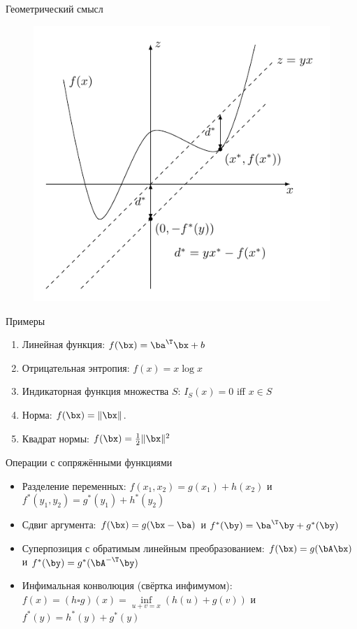 \documentclass[12pt]{beamer}
\begin{document}
\begin{frame}{Геометрический смысл}
\begin{figure}
\includegraphics[scale=1]{geom.pdf}
\end{figure}
\end{frame}

\begin{frame}{Примеры}
\begin{enumerate}
\item Линейная функция: $f(\bx) = \ba^{\T}\bx + b$
\item Отрицательная энтропия: $f(x) = x\log x$
\item Индикаторная функция множества $S$: $I_S(x) = 0$ iff $x \in S$
\item Норма: $f(\bx) = \|\bx\|$.
\item Квадрат нормы: $f(\bx) = \frac{1}{2}\|\bx\|^2$
\end{enumerate}
\end{frame}

\begin{frame}{Операции с сопряжёнными функциями}

\begin{itemize}
\item Разделение переменных: $f(x_1, x_2) = g(x_1) + h(x_2)$ и $f^*(y_1, y_2) = g^*(y_1) + h^*(y_2)$
\item Сдвиг аргумента: $f(\bx) = g(\bx - \ba)$ и $f^*(\by) = \ba^{\T}\by + g^*(\by)$
\item Суперпозиция с обратимым линейным преобразованием: $f(\bx) = g(\bA\bx)$ и $f^*(\by) = g^*(\bA^{-\T}\by)$
\item Инфимальная конволюция (свёртка инфимумом):  $f(x) = (h \square g)(x) = \inf\limits_{u + v = x} (h(u) + g(v))$ и $f^*(y) = h^*(y) + g^*(y)$
\end{itemize}

\end{frame}
\end{document}
